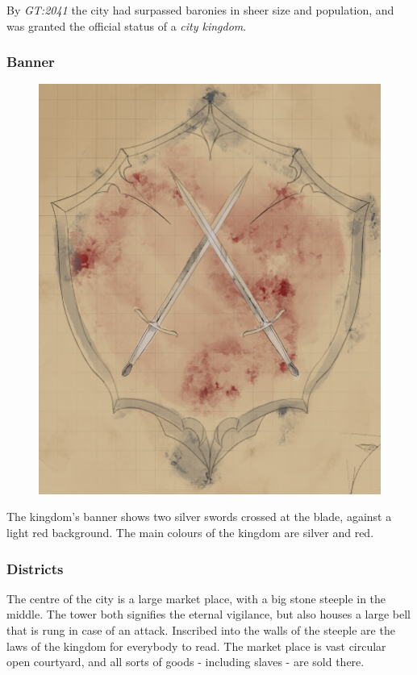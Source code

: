 By \emph{GT:2041} the city had surpassed baronies in sheer size and population,
and was granted the official status of a \emph{city kingdom}.

\subsubsection{Banner}

\begin{figure}[!ht]
  \centering
  \includegraphics[width=0.9\linewidth]{media/norbury-bannersm.png}
\end{figure}

The kingdom's banner shows two silver swords crossed at the blade, against a
light red background. The main colours of the kingdom are silver and red.

\subsubsection{Districts}

The centre of the city is a large market place, with a big stone steeple in
the middle. The tower both signifies the eternal vigilance, but also houses a
large bell that is rung in case of an attack. Inscribed into the walls of
the steeple are the laws of the kingdom for everybody to read. The market
place is vast circular open courtyard, and all sorts of goods - including
slaves - are sold there.

